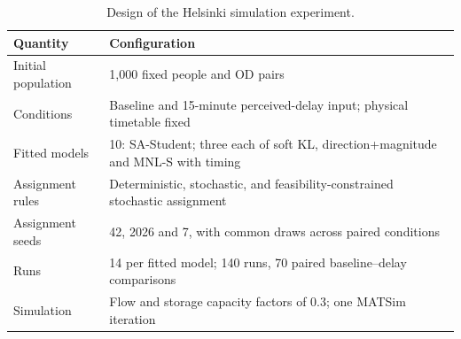 \begin{table}[pos=htbp]
\centering\small
\caption{Design of the Helsinki simulation experiment.}
\label{tab:execution_design}
\begin{tabular*}{\linewidth}{@{\extracolsep{\fill}}ll@{}}
\toprule
Quantity & Configuration \\
\midrule
Initial population & 1,000 fixed people and OD pairs \\
Conditions & Baseline and 15-minute perceived-delay input; physical timetable fixed \\
Fitted models & 10: SA-Student; three each of soft KL, direction+magnitude and MNL-S with timing \\
Assignment rules & Deterministic, stochastic, and feasibility-constrained stochastic assignment \\
Assignment seeds & 42, 2026 and 7, with common draws across paired conditions \\
Runs & 14 per fitted model; 140 runs, 70 paired baseline--delay comparisons \\
Simulation & Flow and storage capacity factors of 0.3; one MATSim iteration \\
\bottomrule
\end{tabular*}
\par{}
\end{table}
